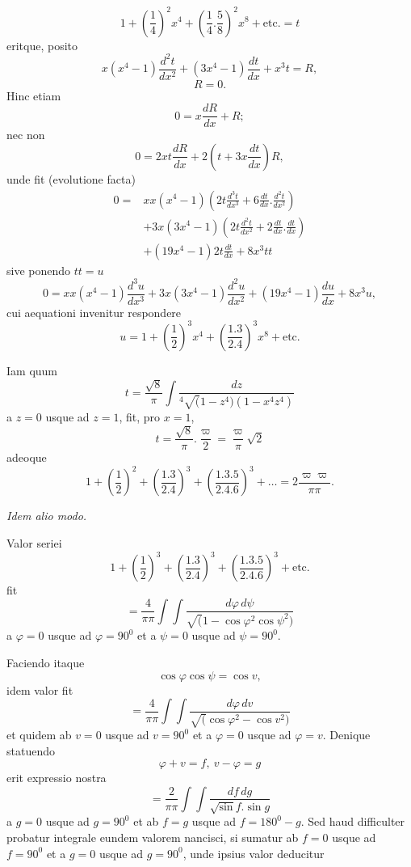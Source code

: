 \[1+\left(\frac14\right)^2x^4+\left(\frac14.\frac58\right)^2x^8+\text{etc.}=t\]
\noindent eritque, posito
\[x(x^4-1)\frac{d^2t}{dx^2}+(3x^4-1)\frac{dt}{dx}+x^3t=R,\]
\[R=0.\]
\noindent Hinc etiam
\[0=x\frac{dR}{dx}+R;\]
\noindent nec non
\[0=2xt\frac{dR}{dx}+2\left(t+3x\frac{dt}{dx}\right)R,\]
\noindent unde fit (evolutione facta)
{\small\[\begin{aligned}
0={}&xx(x^4-1)\left(2t\frac{d^3t}{dx^3}+6\frac{dt}{dx}.\frac{d^2t}{dx^2}\right)\\
&+3x(3x^4-1)\left(2t\frac{d^2t}{dx^2}+2\frac{dt}{dx}.\frac{dt}{dx}\right)\\
&+(19x^4-1)2t\frac{dt}{dx}+8x^3tt
\end{aligned}\]}
\noindent sive ponendo \(tt=u\)
{\small\[0=xx(x^4-1)\frac{d^3u}{dx^3}+3x(3x^4-1)\frac{d^2u}{dx^2}
+(19x^4-1)\frac{du}{dx}+8x^3u,\]}
\noindent cui aequationi invenitur respondere
\[u=1+\left(\frac12\right)^3x^4+\left(\frac{1.3}{2.4}\right)^3x^8+\text{etc.}\]
\noindent [S. 15]
\par\indent Iam quum
\[t=\frac{\surd8}{\pi}\int\frac{dz}{{}^{4}\!\surd(1-z^4)(1-x^4z^4)}\]
\noindent a \(z=0\) usque ad \(z=1\), fit, pro \(x=1\),
\[t=\frac{\surd8}{\pi}.\frac{\varpi}2=\frac{\varpi}{\pi}\surd2\]
\noindent adeoque
\[1+\left(\frac12\right)^2+\left(\frac{1.3}{2.4}\right)^3+\left(\frac{1.3.5}{2.4.6}\right)^3+\ldots
=2\frac{\varpi\varpi}{\pi\pi}.\]
\clearpage
{}
\begin{center}\textit{Idem alio modo.}\end{center}
\par\indent Valor seriei
\[1+\left(\frac12\right)^3+\left(\frac{1.3}{2.4}\right)^3+\left(\frac{1.3.5}{2.4.6}\right)^3+\text{etc.}\]
\noindent fit
\[=\frac4{\pi\pi}\int\int\frac{d\varphi\,d\psi}{\surd(1-\cos\varphi^2\cos\psi^2)}\]
\noindent a \(\varphi=0\) usque ad \(\varphi=90^0\) et a \(\psi=0\) usque ad \(\psi=90^0\).
\par\indent Faciendo itaque
\[\cos\varphi\cos\psi=\cos v,\]
\noindent idem valor fit
\[=\frac4{\pi\pi}\int\int\frac{d\varphi\,dv}{\surd(\cos\varphi^2-\cos v^2)}\]
\noindent et quidem ab \(v=0\) usque ad \(v=90^0\) et a \(\varphi=0\) usque ad \(\varphi=v\). Denique statuendo
\[\varphi+v=f,\ v-\varphi=g\]
\noindent erit expressio nostra
\[=\frac2{\pi\pi}\int\int\frac{df\,dg}{\surd\sin f.\sin g}\]
\noindent a \(g=0\) usque ad \(g=90^0\) et ab \(f=g\) usque ad \(f=180^0-g\).
Sed haud difficulter probatur integrale eundem valorem nancisci, si sumatur ab \(f=0\) usque ad \(f=90^0\) et a \(g=0\) usque ad \(g=90^0\), unde ipsius valor deducitur

